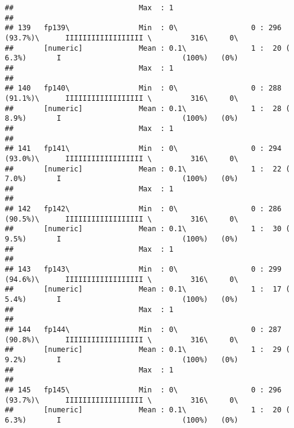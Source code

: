 \documentclass[]{article}
\begin{document}
\begin{verbatim}
##                             Max  : 1                                                                                       
## 
## 139   fp139\                Min  : 0\                 0 : 296 (93.7%)\      IIIIIIIIIIIIIIIIII \         316\     0\       
##       [numeric]             Mean : 0.1\               1 :  20 ( 6.3%)       I                            (100%)   (0%)     
##                             Max  : 1                                                                                       
## 
## 140   fp140\                Min  : 0\                 0 : 288 (91.1%)\      IIIIIIIIIIIIIIIIII \         316\     0\       
##       [numeric]             Mean : 0.1\               1 :  28 ( 8.9%)       I                            (100%)   (0%)     
##                             Max  : 1                                                                                       
## 
## 141   fp141\                Min  : 0\                 0 : 294 (93.0%)\      IIIIIIIIIIIIIIIIII \         316\     0\       
##       [numeric]             Mean : 0.1\               1 :  22 ( 7.0%)       I                            (100%)   (0%)     
##                             Max  : 1                                                                                       
## 
## 142   fp142\                Min  : 0\                 0 : 286 (90.5%)\      IIIIIIIIIIIIIIIIII \         316\     0\       
##       [numeric]             Mean : 0.1\               1 :  30 ( 9.5%)       I                            (100%)   (0%)     
##                             Max  : 1                                                                                       
## 
## 143   fp143\                Min  : 0\                 0 : 299 (94.6%)\      IIIIIIIIIIIIIIIIII \         316\     0\       
##       [numeric]             Mean : 0.1\               1 :  17 ( 5.4%)       I                            (100%)   (0%)     
##                             Max  : 1                                                                                       
## 
## 144   fp144\                Min  : 0\                 0 : 287 (90.8%)\      IIIIIIIIIIIIIIIIII \         316\     0\       
##       [numeric]             Mean : 0.1\               1 :  29 ( 9.2%)       I                            (100%)   (0%)     
##                             Max  : 1                                                                                       
## 
## 145   fp145\                Min  : 0\                 0 : 296 (93.7%)\      IIIIIIIIIIIIIIIIII \         316\     0\       
##       [numeric]             Mean : 0.1\               1 :  20 ( 6.3%)       I                            (100%)   (0%)     

\end{verbatim}
\end{document}
